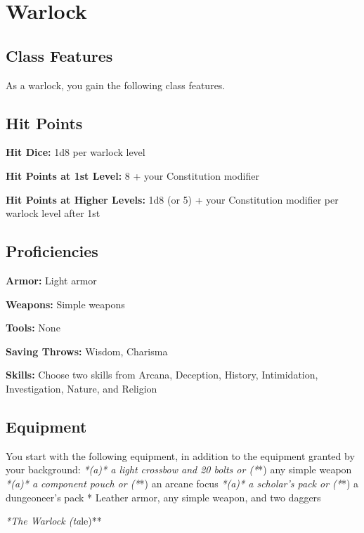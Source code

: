\section{Warlock}

\subsection{Class Features}

As a warlock, you gain the following class features.

\subsection{Hit Points}

\textbf{Hit Dice:} 1d8 per warlock level

\textbf{Hit Points at 1st Level:} 8 + your Constitution modifier

\textbf{Hit Points at Higher Levels:} 1d8 (or 5) + your Constitution modifier per warlock level after 1st

\subsection{Proficiencies}

\textbf{Armor:} Light armor

\textbf{Weapons:} Simple weapons

\textbf{Tools:} None

\textbf{Saving Throws:} Wisdom, Charisma

\textbf{Skills:} Choose two skills from Arcana, Deception, History, Intimidation, Investigation, Nature, and Religion

\subsection{Equipment}

You start with the following equipment, in addition to the equipment granted by your background:
\textit{ *(a)* a light crossbow and 20 bolts or (*}*) any simple weapon
\textit{ *(a)* a component pouch or (*}*) an arcane focus
\textit{ *(a)* a scholar’s pack or (*}*) a dungeoneer’s pack
* Leather armor, any simple weapon, and two daggers

\textit{*The Warlock (ta}le)**

